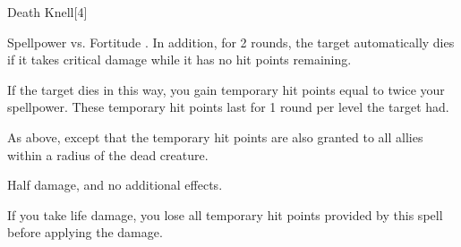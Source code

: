 \begin{spellsection}{Death Knell}[4]
    \begin{spellheader}
    \end{spellheader}
    \begin{spellcontent}
        \begin{spelltargetinginfo}
        \end{spelltargetinginfo}
        \begin{spelleffects}
            \begin{spellattack}{Spellpower vs. Fortitude}
                \spellsuccess {}. In addition, for 2 rounds, the target automatically dies if it takes critical damage while it has no hit points remaining.

                If the target dies in this way, you gain temporary hit points equal to twice your spellpower. These temporary hit points last for 1 round per level the target had.

                \spellcritical As above, except that the temporary hit points are also granted to all allies within a \arealarge radius of the dead creature.

                \spellfailure Half damage, and no additional effects.
            \end{spellattack}
        \end{spelleffects}
    \end{spellcontent}
    \begin{spellfooter}
        \spellnotes If you take life damage, you lose all temporary hit points provided by this spell before applying the damage.
        \miscastrandom
    \end{spellfooter}
\end{spellsection}

